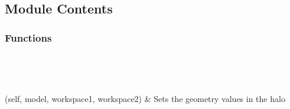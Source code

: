 \documentclass[letterpaper,10pt,english]{sphinxmanual}
\begin{document}
\section{}
\label{\detokenize{autoapi/bc_transfer/index:module-bc_transfer}}\label{\detokenize{autoapi/bc_transfer/index:bc-transfer}}\label{\detokenize{autoapi/bc_transfer/index::doc}}

\subsection{Module Contents}
\label{\detokenize{autoapi/bc_transfer/index:module-contents}}

\subsubsection{Functions}
\label{\detokenize{autoapi/bc_transfer/index:functions}}

\begin{savenotes}\sphinxatlongtablestart\begin{longtable}[c]{}
\hline

\endfirsthead

%
{}\\
\hline

\endhead

\hline
{}\\
\endfoot

\endlastfoot

\sphinxAtStartPar
{\hyperref[\detokenize{autoapi/bc_transfer/index:bc_transfer.transfer_down}]{}}(self, model, workspace1, workspace2)
&
\sphinxAtStartPar
Sets the geometry values in the halo
\\
\hline
\end{longtable}\sphinxatlongtableend\end{savenotes}
\end{document}
